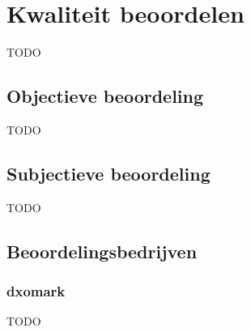 \chapter{Kwaliteit beoordelen}
\label{ch:kwaliteit}

TODO

\section{Objectieve beoordeling}
\label{sec:kwaliteit-objectief}

TODO

\section{Subjectieve beoordeling}
\label{sec:kwaliteit-subjectief}

TODO

\section{Beoordelingsbedrijven}
\label{sec:kwaliteit-bedrijven}

\subsection{dxomark}
\label{sec:kwaliteit-dxomark}

TODO
